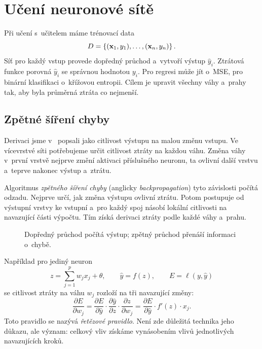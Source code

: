 \section{Učení neuronové sítě}\label{sec:ai-uceni-neuronove-site}

Při učení s~učitelem máme trénovací data
\[
    D
    =
    \left\{
        (\mathbf{x}_1,y_1),\ldots,(\mathbf{x}_n,y_n)
    \right\}.
\]
Síť pro každý vstup provede dopředný průchod a~vytvoří výstup \(\hat y_i\). Ztrátová funkce porovná \(\hat y_i\) se správnou hodnotou \(y_i\). Pro regresi může jít o~MSE, pro binární klasifikaci o~křížovou entropii. Cílem je upravit všechny váhy a~prahy tak, aby byla průměrná ztráta co nejmenší.

\subsection{Zpětné šíření chyby}

Derivaci jsme v~ popsali jako citlivost výstupu na malou změnu vstupu. Ve vícevrstvé síti potřebujeme určit citlivost ztráty na každou váhu. Změna váhy v~první vrstvě nejprve změní aktivaci příslušného neuronu, ta ovlivní další vrstvu a~teprve nakonec výstup a~ztrátu.

Algoritmus \emph{zpětného šíření chyby} (anglicky \emph{backpropagation}) tyto závislosti počítá odzadu. Nejprve určí, jak změna výstupu ovlivní ztrátu. Potom postupuje od výstupní vrstvy ke vstupní a~pro každý spoj násobí lokální citlivosti na navazující části výpočtu. Tím získá derivaci ztráty podle každé váhy a~prahu.

\begin{figure}[ht]
    \centering
    
    \caption{Dopředný průchod počítá výstup; zpětný průchod přenáší informaci o~chybě.}
    \label{fig:ai-backprop}
\end{figure}

Například pro jediný neuron
\[
    z=\sum_{j=1}^{p}w_jx_j+\theta,
    \qquad
    \hat y=f(z),
    \qquad
    E=\ell(y,\hat y)
\]
se citlivost ztráty na váhu \(w_j\) rozloží na tři navazující změny:
\[
    \frac{\partial E}{\partial w_j}
    =
    \frac{\partial E}{\partial\hat y}
    \cdot
    \frac{\partial\hat y}{\partial z}
    \cdot
    \frac{\partial z}{\partial w_j}
    =
    \frac{\partial E}{\partial\hat y}
    \cdot
    f'(z)
    \cdot
    x_j.
\]
Toto pravidlo se nazývá \emph{řetězové pravidlo}. Není zde důležitá technika jeho důkazu, ale význam: celkový vliv získáme vynásobením vlivů jednotlivých navazujících kroků.


